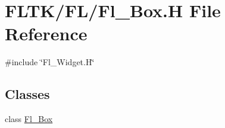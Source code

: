 \hypertarget{_fl___box_8_h}{}\section{F\+L\+T\+K/\+F\+L/\+Fl\+\_\+\+Box.H File Reference}
\label{_fl___box_8_h}
{\ttfamily \#include \char`\"{}Fl\+\_\+\+Widget.\+H\char`\"{}}\newline
\subsection*{Classes}
\begin{DoxyCompactItemize}
\item 
class \hyperlink{class_fl___box}{Fl\+\_\+\+Box}
\end{DoxyCompactItemize}
